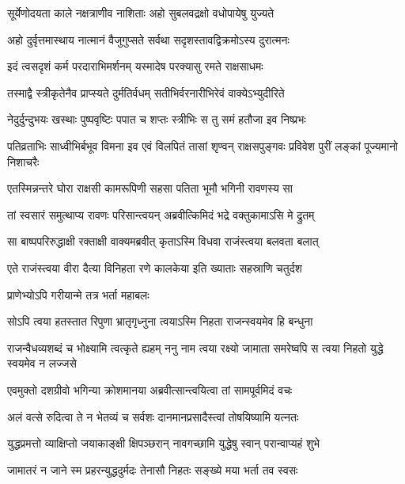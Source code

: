 \twolineshloka
{सूर्येणोदयता काले नक्षत्राणीव नाशिताः}
{अहो सुबलवद्रक्षो वधोपायेषु युज्यते} %

\twolineshloka
{अहो दुर्वृत्तमास्थाय नात्मानं वैजुगुप्सते}
{सर्वथा सदृशस्तावद्विक्रमोऽस्य दुरात्मनः} %

\twolineshloka
{इदं त्वसदृशं कर्म परदाराभिमर्शनम्}
{यस्मादेष परक्यासु रमते राक्षसाधमः} %

\twolineshloka
{तस्माद्वै स्त्रीकृतेनैव प्राप्स्यते दुर्मतिर्वधम्}
{सतीभिर्वरनारीभिरेवं वाक्येऽभ्युदीरिते} %

\twolineshloka
{नेदुर्दुन्दुभयः खस्थाः पुष्पवृष्टिः पपात च}
{शप्तः स्त्रीभिः स तु समं हतौजा इव निष्प्रभः} %

\threelineshloka
{पतिव्रताभिः साध्वीभिर्बभूव विमना इव}
{एवं विलपितं तासां शृण्वन् राक्षसपुङ्गवः}
{प्रविवेश पुरीं लङ्कां पूज्यमानो निशाचरैः} %

\twolineshloka
{एतस्मिन्नन्तरे घोरा राक्षसी कामरूपिणी}
{सहसा पतिता भूमौ भगिनी रावणस्य सा} %

\twolineshloka
{तां स्वसारं समुत्थाप्य रावणः परिसान्त्वयन्}
{अब्रवीत्किमिदं भद्रे वक्तुकामाऽसि मे द्रुतम्} %

\twolineshloka
{सा बाष्पपरिरुद्धाक्षी रक्ताक्षी वाक्यमब्रवीत्}
{कृताऽस्मि विधवा राजंस्त्वया बलवता बलात्} %

\twolineshloka
{एते राजंस्त्वया वीरा दैत्या विनिहता रणे}
{कालकेया इति ख्याताः सहस्राणि चतुर्दश} %

\onelineshloka
{प्राणेभ्योऽपि गरीयान्मे तत्र भर्ता महाबलः} %

\twolineshloka
{सोऽपि त्वया हतस्तात रिपुणा भ्रातृगृध्नुना}
{त्वयाऽस्मि निहता राजन्स्वयमेव हि बन्धुना} %

\threelineshloka
{राजन्वैधव्यशब्दं च भोक्ष्यामि त्वत्कृते ह्यहम्}
{ननु नाम त्वया रक्ष्यो जामाता समरेष्वपि}
{स त्वया निहतो युद्धे स्वयमेव न लज्जसे} %

\twolineshloka
{एवमुक्तो दशग्रीवो भगिन्या क्रोशमानया}
{अब्रवीत्सान्त्वयित्वा तां सामपूर्वमिदं वचः} %

\twolineshloka
{अलं वत्से रुदित्वा ते न भेतव्यं च सर्वशः}
{दानमानप्रसादैस्त्वां तोषयिष्यामि यत्नतः} %

\twolineshloka
{युद्धप्रमत्तो व्याक्षिप्तो जयाकाङ्क्षी क्षिपञ्छरान्}
{नावगच्छामि युद्धेषु स्वान् परान्वाप्यहं शुभे} %

\twolineshloka
{जामातरं न जाने स्म प्रहरन्युद्धदुर्मदः}
{तेनासौ निहतः सङ्ख्ये मया भर्ता तव स्वसः} %

